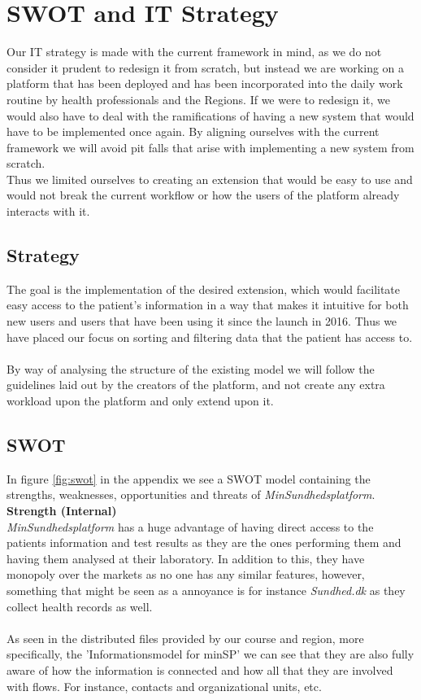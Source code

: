 \documentclass[a4paper,11pt]{article}
\begin{document}
\section{SWOT and IT Strategy}
Our IT strategy is made with the current framework in mind, as we do not consider it prudent to redesign it from scratch, but instead we are working on a platform that has been deployed and has been incorporated into the daily work routine by health professionals and the Regions. If we were to redesign it, we would also have to deal with the ramifications of having a new system that would have to be implemented once again. By aligning ourselves with the current framework we will avoid pit falls that arise with implementing a new system from scratch.\\
Thus we limited ourselves to creating an extension that would be easy to use and would not break the current workflow or how the users of the platform already interacts with it.
\subsection{Strategy}
The goal is the implementation of the desired extension, which would facilitate easy access to the patient's information in a way that makes it intuitive for both new users and users that have been using it since the launch in 2016. Thus we have placed our focus on sorting and filtering data that the patient has access to.\\\\
By way of analysing the structure of the existing model we will follow the guidelines laid out by the creators of the platform, and not create any extra workload upon the platform and only extend upon it.
\subsection{SWOT}
In figure \ref{fig:swot} in the appendix we see a SWOT model containing the strengths, weaknesses, opportunities and threats of \textit{MinSundhedsplatform}.\\

\textbf{Strength (Internal)}\\
\textit{MinSundhedsplatform} has a huge advantage of having direct access to the patients information and test results as they are the ones performing them and having them analysed at their laboratory. In addition to this, they have monopoly over the markets as no one has any similar features, however, something that might be seen as a annoyance is for instance \textit{Sundhed.dk} as they collect health records as well. \\\\
As seen in the distributed files provided by our course and region, more specifically, the 'Informationsmodel for minSP' we can see that they are also fully aware of how the information is connected and how all that they are involved with flows. For instance, contacts and organizational units, etc. \\
\end{document}
